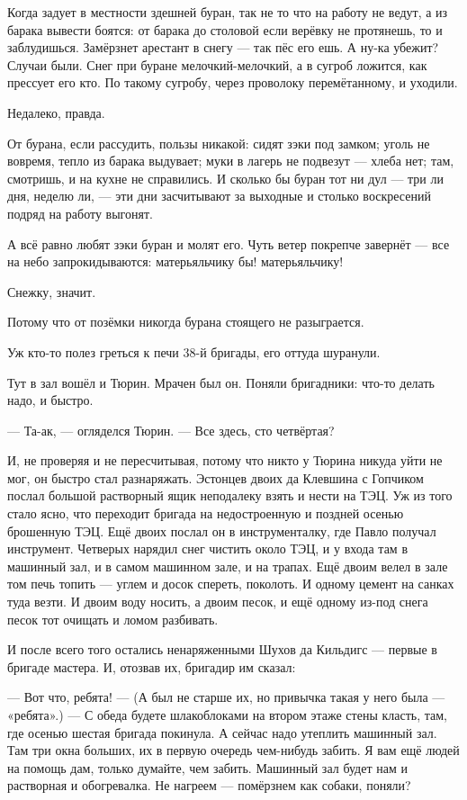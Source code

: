 Когда задует в местности здешней буран, так не то что на работу не ведут, а из барака вывести 
боятся: от барака до столовой если верёвку не протянешь, то и заблудишься. Замёрзнет 
арестант в снегу --- так пёс его ешь. А ну-ка убежит? Случаи были. Снег при буране 
мелочкий-мелочкий, а в сугроб ложится, как прессует его кто. По такому сугробу, через 
проволоку перемётанному, и уходили.

Недалеко, правда.

От бурана, если рассудить, пользы никакой: сидят зэки под замком; уголь не вовремя, тепло из 
барака выдувает; муки в лагерь не подвезут --- хлеба нет; там, смотришь, и на кухне не 
справились. И сколько бы буран тот ни дул --- три ли дня, неделю ли, --- эти дни засчитывают за 
выходные и столько воскресений подряд на работу выгонят.

А всё равно любят зэки буран и молят его. Чуть ветер покрепче завернёт --- все на небо 
запрокидываются: матерьяльчику бы! матерьяльчику!

Снежку, значит.

Потому что от позёмки никогда бурана стоящего не разыграется.

Уж кто-то полез греться к печи 38-й бригады, его оттуда шуранули.

Тут в зал вошёл и Тюрин. Мрачен был он. Поняли бригадники: что-то делать надо, и быстро.

--- Та-ак, --- огляделся Тюрин. --- Все здесь, сто четвёртая?

И, не проверяя и не пересчитывая, потому что никто у Тюрина никуда уйти не мог, он быстро стал 
разнаряжать. Эстонцев двоих да Клевшина с Гопчиком послал большой растворный ящик 
неподалеку взять и нести на ТЭЦ. Уж из того стало ясно, что переходит бригада на 
недостроенную и поздней осенью брошенную ТЭЦ. Ещё двоих послал он в инструменталку, где 
Павло получал инструмент. Четверых нарядил снег чистить около ТЭЦ, и у входа там в машинный 
зал, и в самом машинном зале, и на трапах. Ещё двоим велел в зале том печь топить --- углем и 
досок спереть, поколоть. И одному цемент на санках туда везти. И двоим воду носить, а двоим 
песок, и ещё одному из-под снега песок тот очищать и ломом разбивать.

И после всего того остались ненаряженными Шухов да Кильдигс --- первые в бригаде мастера. И, 
отозвав их, бригадир им сказал:

--- Вот что, ребята! --- (А был не старше их, но привычка такая у него была --- «ребята».) --- С обеда 
будете шлакоблоками на втором этаже стены класть, там, где осенью шестая бригада покинула. А 
сейчас надо утеплить машинный зал. Там три окна больших, их в первую очередь чем-нибудь 
забить. Я вам ещё людей на помощь дам, только думайте, чем забить. Машинный зал будет нам и 
растворная и обогревалка. Не нагреем --- помёрзнем как собаки, поняли?

